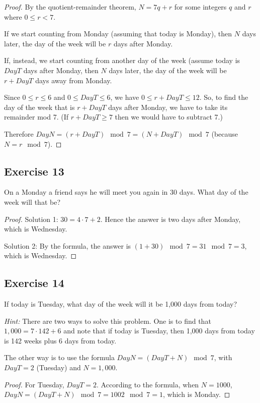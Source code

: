 \documentclass[14pt]{extarticle}
\begin{document}
\begin{proof}
    By the quotient-remainder theorem, $N = 7q + r$ for some integers $q$ and $r$ where $0 \leq r < 7$.

    If we start counting from Monday (assuming that today is Monday), then $N$ days later, the day of the week will be $r$ days after Monday.

    If, instead, we start counting from another day of the week (assume today is $DayT$ days after Monday, then $N$ days later, the day of the week will be $r+DayT$ days away from Monday.

    Since $0 \leq r \leq 6$ and $0 \leq DayT \leq 6$, we have $0 \leq r + DayT \leq 12$. So, to find the day of the week that is $r+DayT$ days after Monday, we have to take its remainder mod 7. (If $r+DayT \geq 7$ then we would have to subtract 7.)

    Therefore $DayN = (r+DayT) \mod 7 = (N + DayT) \mod 7$ (because $N = r \mod 7$).
\end{proof}

\subsection{Exercise 13}
On a Monday a friend says he will meet you again in 30 days. What day of the week will that be?

\begin{proof}
    Solution 1: $30 = 4\cdot 7 + 2$. Hence the answer is two days after Monday, which is Wednesday.

    Solution 2: By the formula, the answer is $(1 + 30) \mod
        7 = 31 \mod 7 = 3$, which is Wednesday.
\end{proof}

\subsection{Exercise 14}
If today is Tuesday, what day of the week will it be 1,000 days from today?

{\it Hint:} There are two ways to solve this problem. One is to find that $1,000 = 7\cdot 142 + 6$ and note that if today is Tuesday, then 1,000 days from today is 142 weeks plus 6 days from today.

The other way is to use the formula $DayN = (DayT + N) \mod 7$, with $DayT = 2$ (Tuesday) and $N = 1,000$.

\begin{proof}
    For Tuesday, $DayT = 2$. According to the formula, when $N  = 1000$, $DayN = (DayT + N) \mod 7 = 1002 \mod 7 = 1$, which is Monday.
\end{proof}
\end{document}
